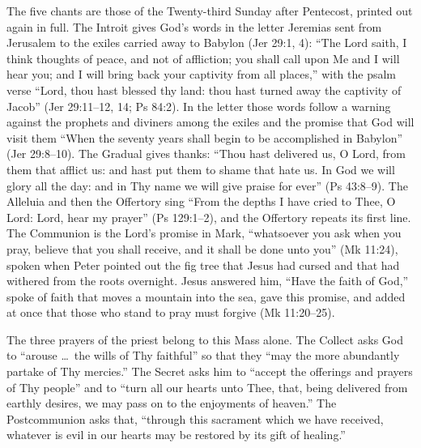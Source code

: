 The five chants are those of the Twenty-third Sunday after Pentecost, printed
out again in full. The Introit gives God's words in the letter Jeremias sent
from Jerusalem to the exiles carried away to Babylon (Jer 29:1, 4): ``The Lord
saith, I think thoughts of peace, and not of affliction; you shall call upon Me
and I will hear you; and I will bring back your captivity from all places,''
with the psalm verse ``Lord, thou hast blessed thy land: thou hast turned away
the captivity of Jacob'' (Jer 29:11--12, 14; Ps 84:2). In the letter those
words follow a warning against the prophets and diviners among the exiles and
the promise that God will visit them ``When the seventy years shall begin to
be accomplished in Babylon'' (Jer 29:8--10). The Gradual gives thanks:
``Thou hast delivered us, O Lord, from them that afflict us: and hast put them
to shame that hate us. In God we will glory all the day: and in Thy name we
will give praise for ever'' (Ps 43:8--9). The Alleluia and then the Offertory
sing ``From the depths I have cried to Thee, O Lord: Lord, hear my prayer''
(Ps 129:1--2), and the Offertory repeats its first line. The Communion is the
Lord's promise in Mark, ``whatsoever you ask when you pray, believe that you
shall receive, and it shall be done unto you'' (Mk 11:24), spoken when Peter
pointed out the fig tree that Jesus had cursed and that had withered from the
roots overnight. Jesus answered him, ``Have the faith of God,'' spoke of
faith that moves a mountain into the sea, gave this promise, and added at once
that those who stand to pray must forgive (Mk 11:20--25).

The three prayers of the priest belong to this Mass alone. The Collect asks
God to ``arouse \dots\ the wills of Thy faithful'' so that they ``may the more
abundantly partake of Thy mercies.'' The Secret asks him to ``accept the
offerings and prayers of Thy people'' and to ``turn all our hearts unto Thee,
that, being delivered from earthly desires, we may pass on to the enjoyments
of heaven.'' The Postcommunion asks that, ``through this sacrament which we
have received, whatever is evil in our hearts may be restored by its gift of
healing.''

